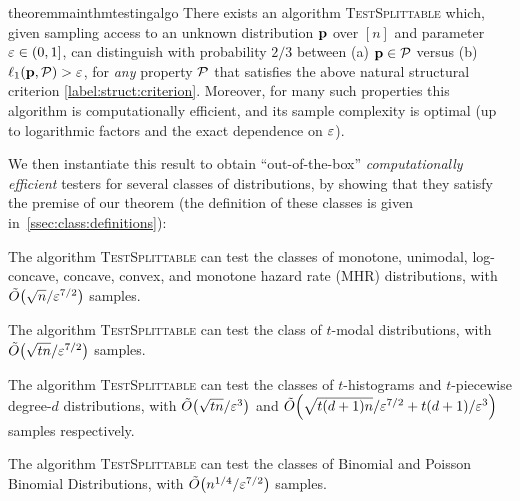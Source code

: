 \begin{restatable}{theorem}{mainthmtestingalgo}\label{theo:main:testing}
There exists an algorithm \textsc{TestSplittable} which, given sampling access to an unknown distribution $\D$ over $[n]$ and parameter $\eps\in(0,1]$, can distinguish with probability $2/3$ between \textsf{(a)} $\D\in\property$ versus \textsf{(b)} $\lp[1](\D, \property) > \eps$, for \emph{any} property $\property$ that satisfies the above natural structural criterion \eqref{label:struct:criterion}. Moreover, for many such properties this algorithm is computationally efficient, and its sample complexity is optimal (up to logarithmic factors and the exact dependence on $\eps$).
\end{restatable} 

\noindent We then instantiate this result to obtain ``out-of-the-box'' \emph{computationally efficient} testers for several classes of distributions, by showing that they satisfy the premise of our theorem (the definition of these classes is given in~\cref{ssec:class:definitions}):

\begin{corollary}\label{coro:main:testing}
The algorithm \textsc{TestSplittable} can test the classes of monotone, unimodal, log-concave, concave, convex, and monotone hazard rate (MHR) distributions, with $\tildeO{\sqrt{n}/\eps^{7/2}}$ samples.
\end{corollary}
\begin{corollary}\label{coro:main:testing:tmod}
The algorithm \textsc{TestSplittable} can test the class of $t$-modal distributions, with $\tildeO{\sqrt{tn}/\eps^{7/2}}$ samples. \end{corollary}

\begin{corollary}\label{coro:main:testing:piecewise}
The algorithm \textsc{TestSplittable} can test the classes of $t$-histograms and $t$-piecewise degree-$d$ distributions, with $\tildeO{\sqrt{tn}/\eps^3}$ and $\tildeO{\sqrt{t(d+1)n}/\eps^{7/2} + t(d+1)/\eps^3}$ samples respectively. \end{corollary}

\begin{corollary}\label{coro:main:testing:pbd}
The algorithm \textsc{TestSplittable} can test the classes of Binomial and Poisson Binomial Distributions, with $\tildeO{{n}^{1/4}/\eps^{7/2}}$ samples.
\end{corollary}

